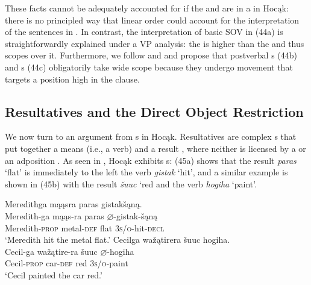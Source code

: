 \documentclass[output=paper]{LSP/langsci}
\begin{document}
These facts cannot be adequately accounted for if the  and  are in a  in Hocąk: there is no principled way that linear order could account for the interpretation of the sentences in . In contrast, the interpretation of basic SOV  in (44a) is straightforwardly explained under a VP analysis: the  is higher than the  and thus scopes over it. Furthermore, we follow \citet{Johnson2014} and  \citet{JohnsonRosen2014} and propose that postverbal s (44b) and s (44c) obligatorily take wide scope because they undergo movement that targets a position high in the clause. 

\subsection{Resultatives and the Direct Object Restriction}

We now turn to an argument from s in Hocąk. Resultatives are complex s that put together a means  (i.e., a verb) and a result , where neither is licensed by a  or an adposition \citep[507]{Williams2008}. As seen in , Hocąk exhibits s: (45a) shows that the result \textit{paras} `flat' is immediately to the left the verb \textit{gistak} `hit', and a similar example is shown in (45b) with the result \textit{\v{s}uuc} `red and the verb \textit{hogiha} `paint'.

\begin{exe}
\ex\label{ex:jrs:45}
\begin{xlist}
\ex 
\glll Meredithga	mąąsra		paras	gistak\v{s}ąną.\\
Meredith-ga			mąąs-ra	paras	$\varnothing$-gistak-\v{s}ąną \\
	Meredith-\textsc{prop}		metal-\textsc{def}		flat	 \textsc{3s/o}-hit-\textsc{decl} \\
\trans `Meredith hit the metal flat.'
\ex 
\glll Cecilga	wa\v{z}ątirera	 \v{s}uuc	hogiha.\\
Cecil-ga	wa\v{z}ątire-ra \v{s}uuc	$\varnothing$-hogiha \\
	Cecil-\textsc{prop}	car-\textsc{def}	red		\textsc{3s/o}-paint \\
\trans `Cecil painted the car red.'
\end{xlist}
\end{exe}
\end{document}
